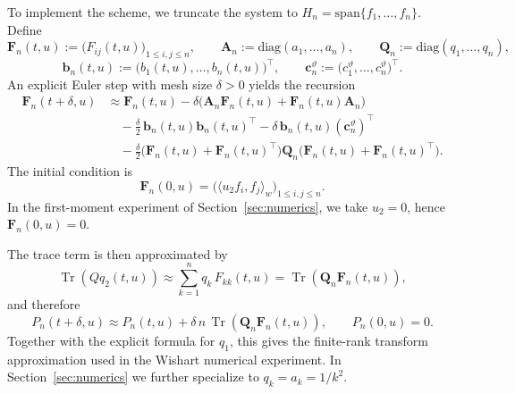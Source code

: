 \documentclass[10pt,a4paper,reqno]{amsart}
\DeclareMathOperator{\tr}{Tr}
\numberwithin{equation}{section}
\theoremstyle{plain}
\theoremstyle{definition}
\theoremstyle{example}
\begin{document}
To implement the scheme, we truncate the system to $H_n=\mathrm{span}\{f_1,\dots,f_n\}$. Define
\begin{equation*}
\mathbf F_n(t,u):=\big(F_{ij}(t,u)\big)_{1\le i,j\le n},\qquad
\mathbf A_n:=\mathrm{diag}(a_1,\dots,a_n),\qquad
\mathbf Q_n:=\mathrm{diag}(q_1,\dots,q_n),
\end{equation*}
\begin{equation*}
\mathbf b_n(t,u):=\big(b_1(t,u),\dots,b_n(t,u)\big)^\top,\qquad
\mathbf c_n^\vartheta:=\big(c_1^\vartheta,\dots,c_n^\vartheta\big)^\top.
\end{equation*}
An explicit Euler step with mesh size $\delta>0$ yields the recursion
\begin{equation}\label{eq:q_2_prod_matrix}
\begin{aligned}
\mathbf F_n(t+\delta,u)
&\approx \mathbf F_n(t,u)-\delta\big(\mathbf A_n\mathbf F_n(t,u)+\mathbf F_n(t,u)\mathbf A_n\big)\\
&\quad -\frac{\delta}{2}\,\mathbf b_n(t,u)\mathbf b_n(t,u)^\top
      -\delta\,\mathbf b_n(t,u)(\mathbf c_n^\vartheta)^\top \\
&\quad -\frac{\delta}{2}\big(\mathbf F_n(t,u)+\mathbf F_n(t,u)^\top\big)
      \mathbf Q_n
      \big(\mathbf F_n(t,u)+\mathbf F_n(t,u)^\top\big).
\end{aligned}
\end{equation}
The initial condition is
\begin{equation*}
\mathbf F_n(0,u)=\big(\langle u_2f_i,f_j\rangle_w\big)_{1\le i,j\le n}.
\end{equation*}
In the first-moment experiment of Section~\ref{sec:numerics}, we take $u_2=0$, hence $\mathbf F_n(0,u)=0$.

The trace term is then approximated by
\begin{equation*}
\tr(Qq_2(t,u))\approx \sum_{k=1}^n q_k\,F_{kk}(t,u)=\tr(\mathbf Q_n\mathbf F_n(t,u)),
\end{equation*}
and therefore
\begin{equation*}
P_n(t+\delta,u)\approx P_n(t,u)+\delta\,n\,\tr(\mathbf Q_n\mathbf F_n(t,u)),\qquad P_n(0,u)=0.
\end{equation*}
Together with the explicit formula for $q_1$, this gives the finite-rank transform approximation used in the Wishart numerical experiment. In Section~\ref{sec:numerics} we further specialize to $q_k=a_k=1/k^2$.




\end{document}
